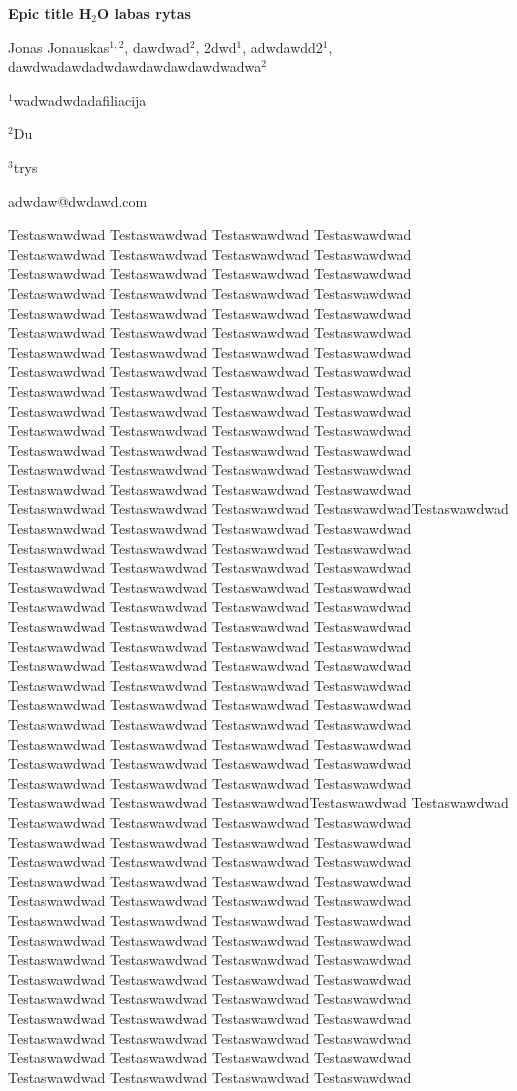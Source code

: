 \documentclass[12pt, twoside, a4paper, hidelinks]{article}
\begin{document}
    \begin{center} {\large \textbf{Epic title H$_{2}$O labas rytas}} \end{center}
    \begin{center} Jonas Jonauskas$^{1,2}$, dawdwad$^{2}$, 2dwd$^{1}$, adwdawdd2$^{1}$, dawdwadawdadwdawdawdawdawdwadwa$^{2}$ \end{center}

    \begin{center} $^{1}$wadwadwdadafiliacija
        
        $^{2}$Du
        
        $^{3}$trys
        
        adwdaw@dwdawd.com
    \end{center}

    Testaswawdwad Testaswawdwad Testaswawdwad Testaswawdwad Testaswawdwad Testaswawdwad Testaswawdwad Testaswawdwad Testaswawdwad Testaswawdwad Testaswawdwad Testaswawdwad Testaswawdwad Testaswawdwad Testaswawdwad Testaswawdwad Testaswawdwad Testaswawdwad Testaswawdwad Testaswawdwad Testaswawdwad Testaswawdwad Testaswawdwad Testaswawdwad Testaswawdwad Testaswawdwad Testaswawdwad Testaswawdwad Testaswawdwad Testaswawdwad Testaswawdwad Testaswawdwad Testaswawdwad Testaswawdwad Testaswawdwad Testaswawdwad Testaswawdwad Testaswawdwad Testaswawdwad Testaswawdwad Testaswawdwad Testaswawdwad Testaswawdwad Testaswawdwad Testaswawdwad Testaswawdwad Testaswawdwad Testaswawdwad Testaswawdwad Testaswawdwad Testaswawdwad Testaswawdwad Testaswawdwad Testaswawdwad Testaswawdwad Testaswawdwad Testaswawdwad Testaswawdwad Testaswawdwad TestaswawdwadTestaswawdwad Testaswawdwad Testaswawdwad Testaswawdwad Testaswawdwad Testaswawdwad Testaswawdwad Testaswawdwad Testaswawdwad Testaswawdwad Testaswawdwad Testaswawdwad Testaswawdwad Testaswawdwad Testaswawdwad Testaswawdwad Testaswawdwad Testaswawdwad Testaswawdwad Testaswawdwad Testaswawdwad Testaswawdwad Testaswawdwad Testaswawdwad Testaswawdwad Testaswawdwad Testaswawdwad Testaswawdwad Testaswawdwad Testaswawdwad Testaswawdwad Testaswawdwad Testaswawdwad Testaswawdwad Testaswawdwad Testaswawdwad Testaswawdwad Testaswawdwad Testaswawdwad Testaswawdwad Testaswawdwad Testaswawdwad Testaswawdwad Testaswawdwad Testaswawdwad Testaswawdwad Testaswawdwad Testaswawdwad Testaswawdwad Testaswawdwad Testaswawdwad Testaswawdwad Testaswawdwad Testaswawdwad Testaswawdwad Testaswawdwad Testaswawdwad Testaswawdwad Testaswawdwad TestaswawdwadTestaswawdwad Testaswawdwad Testaswawdwad Testaswawdwad Testaswawdwad Testaswawdwad Testaswawdwad Testaswawdwad Testaswawdwad Testaswawdwad Testaswawdwad Testaswawdwad Testaswawdwad Testaswawdwad Testaswawdwad Testaswawdwad Testaswawdwad Testaswawdwad Testaswawdwad Testaswawdwad Testaswawdwad Testaswawdwad Testaswawdwad Testaswawdwad Testaswawdwad Testaswawdwad Testaswawdwad Testaswawdwad Testaswawdwad Testaswawdwad Testaswawdwad Testaswawdwad Testaswawdwad Testaswawdwad Testaswawdwad Testaswawdwad Testaswawdwad Testaswawdwad Testaswawdwad Testaswawdwad Testaswawdwad Testaswawdwad Testaswawdwad Testaswawdwad Testaswawdwad Testaswawdwad Testaswawdwad Testaswawdwad Testaswawdwad Testaswawdwad Testaswawdwad Testaswawdwad Testaswawdwad Testaswawdwad Testaswawdwad Testaswawdwad Testaswawdwad Testaswawdwad 
\end{document}
